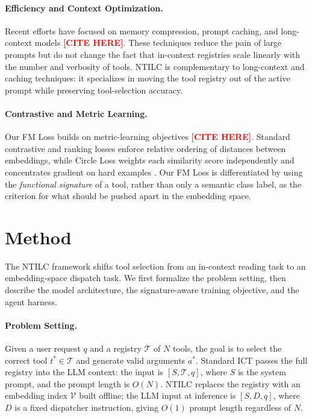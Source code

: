 \documentclass{article}
\newcommand{\placeholder}[1]{\textcolor{red}{\textbf{[#1]}}}
\begin{document}
\paragraph{Efficiency and Context Optimization.}
Recent efforts have focused on memory compression, prompt caching, and long-context models \placeholder{CITE HERE}.
These techniques reduce the pain of large prompts but do not change the fact that in-context registries scale linearly with the number and verbosity of tools.
NTILC is complementary to long-context and caching techniques: it specializes in moving the tool registry out of the active prompt while preserving tool-selection accuracy.

\paragraph{Contrastive and Metric Learning.}
Our FM Loss builds on metric-learning objectives \placeholder{CITE HERE}.
Standard contrastive and ranking losses enforce relative ordering of distances between embeddings, while Circle Loss weights each similarity score independently and concentrates gradient on hard examples \cite{sun2020circlelossunifiedperspective}.
Our FM Loss is differentiated by using the \textit{functional signature} of a tool, rather than only a semantic class label, as the criterion for what should be pushed apart in the embedding space.

\section{Method}

The NTILC framework shifts tool selection from an in-context reading task to an embedding-space dispatch task.
We first formalize the problem setting, then describe the model architecture, the signature-aware training objective, and the agent harness.

\paragraph{Problem Setting.}
Given a user request $q$ and a registry $\mathcal{T}$ of $N$ tools, the goal is to select the correct tool $t^* \in \mathcal{T}$ and generate valid arguments $a^*$.
Standard ICT passes the full registry into the LLM context: the input is $[S, \mathcal{T}, q]$, where $S$ is the system prompt, and the prompt length is $O(N)$.
NTILC replaces the registry with an embedding index $\mathcal{V}$ built offline; the LLM input at inference is $[S, D, q]$, where $D$ is a fixed dispatcher instruction, giving $O(1)$ prompt length regardless of $N$.
\end{document}
